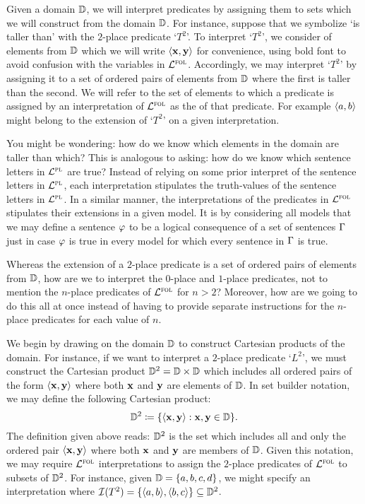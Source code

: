 Given a domain $\mathbb{D}$, we will interpret predicates by assigning them to sets which we will construct from the domain $\mathbb{D}$.
For instance, suppose that we symbolize `is taller than' with the $2$-place predicate `$T^2$'.
To interpret `$T^2$', we consider  of elements from $\mathbb{D}$ which we will write $\langle\mathbf{x},\mathbf{y}\rangle$ for convenience, using bold font to avoid confusion with the variables in $\mathcal{L}^{\textsc{fol}}$. 
Accordingly, we may interpret `$T^2$' by assigning it to a set of ordered pairs of elements from $\mathbb{D}$ where the first is taller than the second.
We will refer to the set of elements to which a predicate is assigned by an interpretation of $\mathcal{L}^{\textsc{fol}}$ as the  of that predicate.
For example $\langle a,b\rangle$ might belong to the extension of `$T^2$' on a given interpretation. 

You might be wondering: how do we know which elements in the domain are taller than which?
This is analogous to asking: how do we know which sentence letters in $\mathcal{L}^{\textsc{pl}}$ are true?
Instead of relying on some prior interpret of the sentence letters in $\mathcal{L}^{\textsc{pl}}$, each interpretation stipulates the truth-values of the sentence letters in $\mathcal{L}^{\textsc{pl}}$.
In a similar manner, the interpretations of the predicates in $\mathcal{L}^{\textsc{fol}}$ stipulates their extensions in a given model.
It is by considering all models that we may define a sentence $\varphi$ to be a logical consequence of a set of sentences $\Gamma$ just in case $\varphi$ is true in every model for which every sentence in $\Gamma$ is true.

Whereas the extension of a $2$-place predicate is a set of ordered pairs of elements from $\mathbb{D}$, how are we to interpret the $0$-place and $1$-place predicates, not to mention the $n$-place predicates of $\mathcal{L}^{\textsc{fol}}$ for $n>2$?
Moreover, how are we going to do this all at once instead of having to provide separate instructions for the $n$-place predicates for each value of $n$.

We begin by drawing on the domain $\mathbb{D}$ to construct Cartesian products of the domain.
For instance, if we want to interpret a $2$-place predicate `$L^2$', we must construct the Cartesian product $\mathbb{D}^2=\mathbb{D}\times\mathbb{D}$ which includes all ordered pairs of the form $\langle\mathbf{x},\mathbf{y}\rangle$ where both $\mathbf{x}$ and $\mathbf{y}$ are elements of $\mathbb{D}$.
In set builder notation, we may define the following Cartesian product: 
  $$ \mathbb{D}^2 \coloneq \lbrace\langle\mathbf{x},\mathbf{y}\rangle:\mathbf{x},\mathbf{y}\in\mathbb{D}\rbrace. $$
The definition given above reads: $\mathbb{D}^2$ is the set which includes all and only the ordered pair $\langle\mathbf{x},\mathbf{y}\rangle$ where both $\mathbf{x}$ and $\mathbf{y}$ are members of $\mathbb{D}$. 
Given this notation, we may require $\mathcal{L}^{\textsc{fol}}$ interpretations to assign the $2$-place predicates of $\mathcal{L}^{\textsc{fol}}$ to subsets of $\mathbb{D}^2$. 
For instance, given $\mathbb{D}=\lbrace a,b,c,d\rbrace$, we might specify an interpretation where $\mathcal{I}(T^2)=\lbrace\langle a,b\rangle,\langle b,c\rangle\rbrace\subseteq\mathbb{D}^2$.

